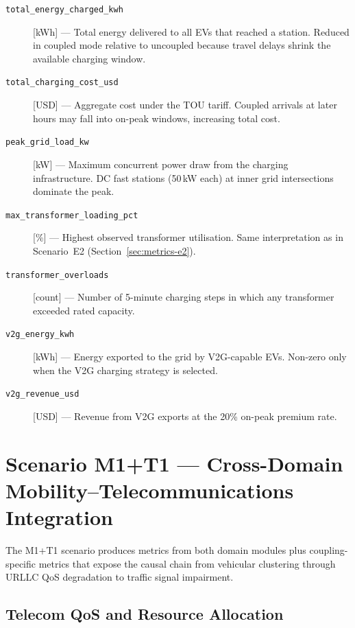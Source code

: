 \begin{description}

\item[\texttt{total\_energy\_charged\_kwh}] [kWh] ---
  Total energy delivered to all EVs that reached a station.  Reduced in
  coupled mode relative to uncoupled because travel delays shrink the
  available charging window.

\item[\texttt{total\_charging\_cost\_usd}] [USD] ---
  Aggregate cost under the TOU tariff.  Coupled arrivals at later hours may
  fall into on-peak windows, increasing total cost.

\item[\texttt{peak\_grid\_load\_kw}] [kW] ---
  Maximum concurrent power draw from the charging infrastructure.  DC fast
  stations (50\,kW each) at inner grid intersections dominate the peak.

\item[\texttt{max\_transformer\_loading\_pct}] [\%] ---
  Highest observed transformer utilisation.  Same interpretation as in
  Scenario~E2 (Section~\ref{sec:metrics-e2}).

\item[\texttt{transformer\_overloads}] [count] ---
  Number of 5-minute charging steps in which any transformer exceeded rated
  capacity.

\item[\texttt{v2g\_energy\_kwh}] [kWh] ---
  Energy exported to the grid by V2G-capable EVs.  Non-zero only when the V2G
  charging strategy is selected.

\item[\texttt{v2g\_revenue\_usd}] [USD] ---
  Revenue from V2G exports at the 20\% on-peak premium rate.

\end{description}

\section{Scenario M1+T1 --- Cross-Domain Mobility--Telecommunications Integration}
\label{sec:metrics-m1t1}

The M1+T1 scenario produces metrics from both domain modules plus
coupling-specific metrics that expose the causal chain from vehicular
clustering through URLLC QoS degradation to traffic signal impairment.

\subsection*{Telecom QoS and Resource Allocation}

